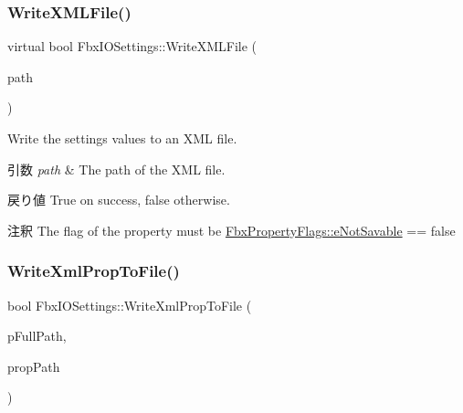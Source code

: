 \subsubsection{\texorpdfstring{Write\+X\+M\+L\+File()}{WriteXMLFile()}}
{\footnotesize\ttfamily virtual bool Fbx\+I\+O\+Settings\+::\+Write\+X\+M\+L\+File (\begin{DoxyParamCaption}\item[{const \hyperlink{class_fbx_string}{Fbx\+String} \&}]{path }\end{DoxyParamCaption})\hspace{0.3cm}{\ttfamily [virtual]}}

Write the settings values to an X\+ML file. 
\begin{DoxyParams}{引数}
{\em path} & The path of the X\+ML file. \\
\hline
\end{DoxyParams}
\begin{DoxyReturn}{戻り値}
{\ttfamily True} on success, {\ttfamily false} otherwise. 
\end{DoxyReturn}
\begin{DoxyRemark}{注釈}
The flag of the property must be \hyperlink{class_fbx_property_flags_afabfa7e0949aac8a7dcdf8a141867e99a11531771ac2c7b07d8b49641028f2b57}{Fbx\+Property\+Flags\+::e\+Not\+Savable} == false 
\end{DoxyRemark}
\mbox{\label{class_fbx_i_o_settings_abd6cac9a8962bee693960397190a9771}} 
\subsubsection{\texorpdfstring{Write\+Xml\+Prop\+To\+File()}{WriteXmlPropToFile()}}
{\footnotesize\ttfamily bool Fbx\+I\+O\+Settings\+::\+Write\+Xml\+Prop\+To\+File (\begin{DoxyParamCaption}\item[{const \hyperlink{class_fbx_string}{Fbx\+String} \&}]{p\+Full\+Path,  }\item[{const \hyperlink{class_fbx_string}{Fbx\+String} \&}]{prop\+Path }\end{DoxyParamCaption})}

